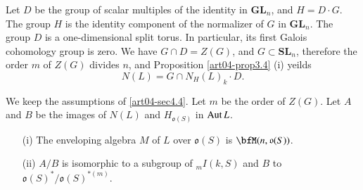 Let $D$ be the group of scalar multiples of the identity in $\mathbf{GL}_{n}$, and $H=D\cdot G$. The group $H$ is the identity component of the normalizer of $G$ in $\mathbf{GL}_{n}$. The group $D$ is a one-dimensional split torus. In particular, its first Galois cohomology group is zero. We have $G\cap D=Z(G)$, and $G\subset \mathbf{SL}_{n}$, therefore the order $m$ of $Z(G)$ divides $n$, and Proposition \ref{art04-prop3.4} (i) yeilds
\setcounter{equation}{0}
\begin{equation}
N(L)=G\cap N_{H}(L)_{k}\cdot D.\label{art04-sec4.4-eq1}
\end{equation}

\setcounter{theorem}{4}
\begin{lemma}\label{art04-lem4.5}
We keep the assumptions of \ref{art04-sec4.4}. Let $m$ be the order of $Z(G)$. Let $A$ and $B$ be the images of $N(L)$ and $H_{\mathfrak{o}(S)}$ in $\operatorname{\mathrm{Aut}} L$.
\begin{itemize}
\item[{\rm(i)}] The enveloping algebra $M$ of $L$ over $\mathfrak{o}(S)$ is $\bfM(n,\mathfrak{o}(S))$.

\item[{\rm(ii)}] $A/B$ is isomorphic to a subgroup of ${}_{m}I(k,S)$ and $B$ to $\mathfrak{o}(S)^{*}/\mathfrak{o}(S)^{*(m)}$.
\end{itemize}
\end{lemma}

